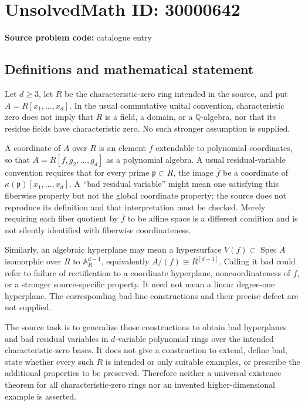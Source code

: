 \documentclass[11pt]{article}
\newcommand{\Q}{\mathbb{Q}}
\newcommand{\A}{\mathbb{A}}
\begin{document}
\section*{UnsolvedMath ID: 30000642}
\textbf{Source problem code:} catalogue entry
\subsection{Definitions and mathematical statement}
Let \(d\geq3\), let \(R\) be the characteristic-zero ring intended in the source, and put \(A=R[x_1,\ldots,x_d]\). In the usual commutative unital convention, characteristic zero does not imply that \(R\) is a field, a domain, or a \(\Q\)-algebra, nor that its residue fields have characteristic zero. No such stronger assumption is supplied.

A coordinate of \(A\) over \(R\) is an element \(f\) extendable to polynomial coordinates, so that \(A=R[f,g_2,\ldots,g_d]\) as a polynomial algebra. A usual residual-variable convention requires that for every prime \(\mathfrak p\subset R\), the image \(\overline f\) be a coordinate of \(\kappa(\mathfrak p)[x_1,\ldots,x_d]\). A ``bad residual variable'' might mean one satisfying this fiberwise property but not the global coordinate property; the source does not reproduce its definition and that interpretation must be checked. Merely requiring each fiber quotient by \(\overline f\) to be affine space is a different condition and is not silently identified with fiberwise coordinateness.

Similarly, an algebraic hyperplane may mean a hypersurface \(V(f)\subset\operatorname{Spec}A\) isomorphic over \(R\) to \(\A_R^{d-1}\), equivalently \(A/(f)\cong R^{[d-1]}\). Calling it bad could refer to failure of rectification to a coordinate hyperplane, noncoordinateness of \(f\), or a stronger source-specific property. It need not mean a linear degree-one hyperplane. The corresponding bad-line constructions and their precise defect are not supplied.

The source task is to generalize those constructions to obtain bad hyperplanes and bad residual variables in \(d\)-variable polynomial rings over the intended characteristic-zero bases. It does not give a construction to extend, define bad, state whether every such \(R\) is intended or only suitable examples, or prescribe the additional properties to be preserved. Therefore neither a universal existence theorem for all characteristic-zero rings nor an invented higher-dimensional example is asserted.
\end{document}
